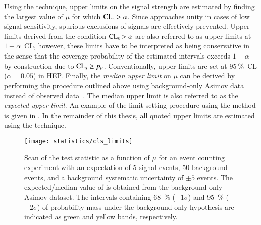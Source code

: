 Using the \CLs technique, upper limits on the signal strength are estimated by
finding the largest value of $\mu$ for which $\text{CL}_{\text{s}} > \alpha$. Since \CLs
approaches unity in cases of low signal sensitivity, spurious exclusions of
signals are effectively prevented. Upper limits derived from the condition
$\text{CL}_{\text{s}} > \alpha$ are also referred to as upper limits at $1 - \alpha$~CL,
however, these limits have to be interpreted as being conservative in the sense
that the coverage probability of the estimated intervals exceeds $1 - \alpha$ by
construction due to $\text{CL}_{\text{s}} \geq p_\mu$. Conventionally, upper limits are set at
$\SI{95}{\percent}$~CL ($\alpha = 0.05$) in HEP.  Finally, the \emph{median
  upper limit} on $\mu$ can be derived by performing the procedure outlined
above using background-only Asimov data instead of observed
data~\cite{Cowan:2010js}. The median upper limit is also referred to as the
\emph{expected upper limit}. An example of the limit setting procedure using the
\CLs method is given in . In the remainder of this thesis,
all quoted upper limits are estimated using the \CLs technique.

\begin{figure}[htbp]
  \centering

  \texttt{[image: statistics/cls\_limits]}

  \caption{Scan of the \CLs test statistic as a function of $\mu$ for an event
    counting experiment with an expectation of 5 signal events, 50 background
    events, and a background systematic uncertainty of $\pm 5$ events. The
    expected/median value of \CLs is obtained from the background-only Asimov
    dataset. The \CLs intervals containing \SI{68}{\percent} ($\pm 1 \sigma$)
    and \SI{95}{\percent} ($\pm 2 \sigma$) of probability mass under the
    background-only hypothesis are indicated as green and yellow bands,
    respectively.}%
  \label{fig:cls_example}
\end{figure}


